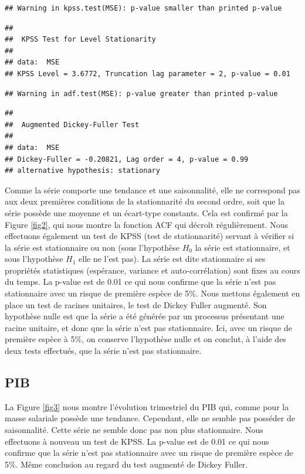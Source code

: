 \documentclass[11pt,]{article}
\begin{document}
\begin{verbatim}
## Warning in kpss.test(MSE): p-value smaller than printed p-value
\end{verbatim}

\begin{verbatim}
## 
##  KPSS Test for Level Stationarity
## 
## data:  MSE
## KPSS Level = 3.6772, Truncation lag parameter = 2, p-value = 0.01
\end{verbatim}

\begin{verbatim}
## Warning in adf.test(MSE): p-value greater than printed p-value
\end{verbatim}

\begin{verbatim}
## 
##  Augmented Dickey-Fuller Test
## 
## data:  MSE
## Dickey-Fuller = -0.20821, Lag order = 4, p-value = 0.99
## alternative hypothesis: stationary
\end{verbatim}

Comme la série comporte une tendance et une saisonnalité, elle ne
correspond pas aux deux premières conditions de la stationnarité du
second ordre, soit que la série possède une moyenne et un écart-type
constants. Cela est confirmé par la Figure \ref{fig2}, qui nous montre
la fonction ACF qui décroît régulièrement. Nous effectuons également un
test de KPSS (test de stationnarité) servant à vérifier si la série est
stationnaire ou non (sous l'hypothèse \(H_{0}\) la série est
stationnaire, et sous l'hypothèse \(H_{1}\) elle ne l'est pas). La série
est dite stationnaire si ses propriétés statistiques (espérance,
variance et auto-corrélation) sont fixes au cours du temps. La p-value
est de 0.01 ce qui nous confirme que la série n'est pas stationnaire
avec un risque de première espèce de 5\%. Nous mettons également en
place un test de racines unitaires, le test de Dickey Fuller augmenté.
Son hypothèse nulle est que la série a été générée par un processus
présentant une racine unitaire, et donc que la série n'est pas
stationnaire. Ici, avec un risque de première espèce à 5\%, on conserve
l'hypothèse nulle et on conclut, à l'aide des deux tests effectués, que
la série n'est pas stationnaire.

\subsection{\texorpdfstring{PIB \label{PIB}}{PIB }}\label{pib}

La Figure \ref{fig3} nous montre l'évolution trimestriel du PIB qui,
comme pour la masse salariale possède une tendance. Cependant, elle ne
semble pas posséder de saisonnalité. Cette série ne semble donc pas non
plus stationnaire. Nous effectuons à nouveau un test de KPSS. La p-value
est de 0.01 ce qui nous confirme que la série n'est pas stationnaire
avec un risque de première espèce de 5\%. Même conclusion au regard du
test augmenté de Dickey Fuller.
\end{document}
